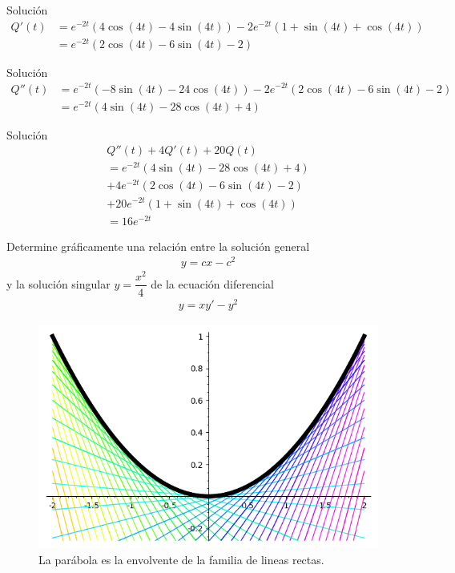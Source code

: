 {Solución}
\begin{align}
	Q'(t) &= e^{-2t}\left( 4\cos(4t)-4\sin(4t) \right)
	-2e^{-2t}\left( 1+\sin(4t)+\cos(4t) \right)\\
	&=e^{-2t}\left( 2\cos(4t)-6\sin(4t)-2 \right)
\end{align}


{Solución}
\begin{align}
	Q''(t) &= e^{-2t}\left( -8\sin(4t)-24\cos(4t) \right)
	-2e^{-2t}\left( 2\cos(4t)-6\sin(4t)-2 \right)\\
	& = e^{-2t}\left( 4\sin(4t)-28\cos(4t)+4 \right)
\end{align}



{Solución}
\begin{align}
	Q''(t)+4Q'(t)+20Q(t) \\
	=
	e^{-2t}\left( 4\sin(4t)-28\cos(4t)+4 \right) \\
	+4e^{-2t}\left( 2\cos(4t)-6\sin(4t)-2 \right) \\
	+20e^{-2t}\left(
	1+\sin(4t)+\cos(4t)
	\right) \\
	=  16e^{-2t}
\end{align}




Determine gráficamente una relación entre la solución general
\begin{align}
	y = cx-c^{2}
\end{align}
y la solución singular $y=\dfrac{x^{2}}{4}$ de la ecuación diferencial
\begin{align}
	y = xy'-y^{2}
\end{align}



\begin{figure}
	\centering
	\includegraphics[width=\textwidth,keepaspectratio=true]{./edo/solved_problem_02-05.png}
	\caption{La parábola es la envolvente de la familia de lineas rectas. }
	\label{fig:solved_problem_02-05}
\end{figure}




